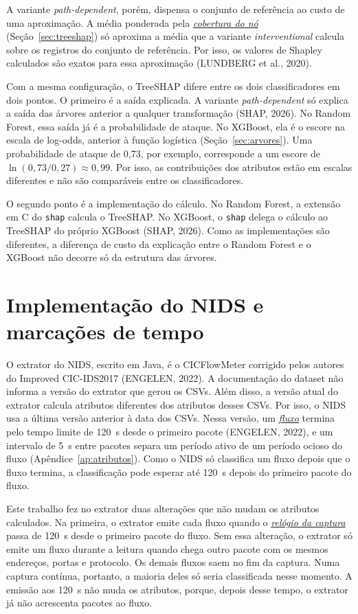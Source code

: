 \documentclass[
  12pt,
  oneside,
  a4paper,
  chapter=TITLE,
  sumario=tradicional,
  english,
  brazil
]{abntex2}
\newcommand{\termo}[2]{\hyperref[gl:#1]{\emph{#2}}}
\begin{document}
A variante \emph{path-dependent}, porém, dispensa o conjunto de referência ao custo de uma
aproximação. A média ponderada pela \termo{cobertura-no}{cobertura do nó}
(Seção~\ref{sec:treeshap}) só aproxima a média que a variante \emph{interventional} calcula sobre os
registros do conjunto de referência. Por isso, os valores de Shapley calculados são exatos para essa
aproximação (LUNDBERG et al., 2020).

Com a mesma configuração, o TreeSHAP difere entre os dois classificadores em
dois pontos. O primeiro é a saída explicada. A variante \emph{path-dependent} só explica a saída das
árvores anterior a qualquer transformação (SHAP, 2026). No Random Forest, essa saída já é a
probabilidade de ataque. No XGBoost, ela é o escore na escala de log-odds, anterior à função
logística (Seção~\ref{sec:arvores}). Uma probabilidade de ataque de 0,73, por exemplo, corresponde
a um escore de $\ln(0{,}73/0{,}27) \approx 0{,}99$. Por isso, as contribuições dos atributos estão em escalas
diferentes e não são comparáveis entre os classificadores.

O segundo ponto é a implementação do cálculo. No Random Forest, a extensão em C do \texttt{shap}
calcula o TreeSHAP. No XGBoost, o \texttt{shap} delega o cálculo ao TreeSHAP do próprio XGBoost
(SHAP, 2026). Como as implementações são diferentes, a diferença de custo da explicação entre o
Random Forest e o XGBoost não decorre só da estrutura das árvores.

\section{Implementação do NIDS e marcações de tempo}
\label{sec:nids}

O extrator do NIDS, escrito em Java, é o CICFlowMeter corrigido pelos autores do Improved
CIC-IDS2017 (ENGELEN, 2022). A documentação do dataset não informa a versão do extrator que gerou
os CSVs. Além disso, a versão atual do extrator calcula atributos diferentes dos atributos desses
CSVs. Por
isso, o NIDS usa a última versão anterior à data dos CSVs. Nessa versão, um \termo{fluxo}{fluxo}
termina pelo tempo limite de 120~s desde o primeiro pacote (ENGELEN, 2022), e um
intervalo de 5~s entre pacotes separa um período ativo de um período ocioso do fluxo
(Apêndice~\ref{ap:atributos}). Como o NIDS só classifica um fluxo depois que o fluxo termina, a
classificação pode esperar até 120~s depois do primeiro pacote do fluxo.

Este trabalho fez no extrator duas alterações que não mudam os atributos calculados. Na primeira,
o extrator emite cada fluxo quando o \termo{relogio}{relógio da captura} passa de 120~s desde o
primeiro pacote do fluxo. Sem essa alteração, o extrator só emite um fluxo durante a leitura quando
chega outro pacote com os mesmos endereços, portas e protocolo. Os demais fluxos saem no fim da
captura. Numa captura contínua, portanto, a maioria deles só seria classificada nesse momento. A
emissão aos 120~s não muda os atributos, porque, depois desse tempo, o extrator já não acrescenta
pacotes ao fluxo.
\end{document}

